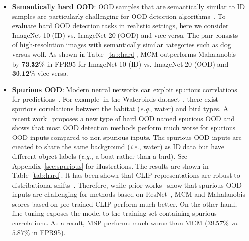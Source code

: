 \documentclass{article}
\def\ie{\emph{i.e}., }
\def\eg{\emph{e.g}., }
\begin{document}
\begin{itemize}[leftmargin=*,topsep=4pt,itemsep=4pt,parsep=0pt]
    \item \textbf{Semantically hard OOD}: OOD samples that are semantically similar to ID samples are particularly challenging for OOD detection algorithms~\cite{winkens2020contrastive}. To evaluate hard OOD detection tasks in realistic settings, here we consider ImageNet-10 (ID) vs. ImageNet-20 (OOD) and vice versa. The pair consists of high-resolution images with semantically similar categories such as dog versus wolf. As shown in Table~\ref{tab:hard}, MCM outperforms Mahalanobis~\cite{lee2018simple} by $\textbf{73.32\%}$ in FPR95 for ImageNet-10 (ID) vs. ImageNet-20 (OOD) and $\textbf{30.12\%}$ vice versa.  
    \item \textbf{Spurious OOD}: Modern neural networks can exploit spurious correlations for predictions~\cite{beery2018recognition}. For example, in the Waterbirds dataset~\cite{sagawa2019distributionally}, there exist spurious correlations between the habitat (\eg water) and bird types. A recent work~\cite{ming2022spurious} proposes a new type of hard OOD named spurious OOD and shows that most OOD detection methods perform much worse for spurious OOD inputs compared to non-spurious inputs.  The spurious OOD inputs are created to share the same background (\ie water) as ID data but have different object labels (\eg a boat rather than a bird). See Appendix~\ref{sec:spurious} for illustrations. The results are shown in Table~\ref{tab:hard}. It has been shown that CLIP representations are robust to distributional shifts~\cite{radford2021learning}. Therefore, while prior works~\cite{ming2022spurious} show that spurious OOD inputs are challenging for methods based on ResNet~\cite{he2016deep}, MCM and Mahalanobis scores based on pre-trained CLIP perform much better. On the other hand, fine-tuning exposes the model to the training set containing spurious correlations. As a result, MSP performs much worse than MCM ($39.57\%$ vs. $5.87\%$ in FPR95).

\end{itemize}
\end{document}
